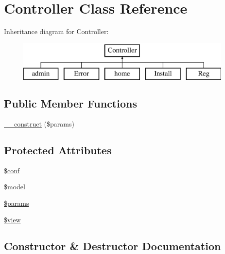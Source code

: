 \hypertarget{classController}{}\section{Controller Class Reference}
\label{classController}
Inheritance diagram for Controller\+:\begin{figure}[H]
\begin{center}
\leavevmode
\includegraphics[height=2.000000cm]{classController}
\end{center}
\end{figure}
\subsection*{Public Member Functions}
\begin{DoxyCompactItemize}
\item 
\hyperlink{classController_a3587ca21b29970ecf850db960cf5d1e2}{\+\_\+\+\_\+construct} (\$params)
\end{DoxyCompactItemize}
\subsection*{Protected Attributes}
\begin{DoxyCompactItemize}
\item 
\hyperlink{classController_a51a5fe961b85fbecd86fd82185652060}{\$conf}
\item 
\hyperlink{classController_a4078f8d070afa3d19a462422fa1a3547}{\$model}
\item 
\hyperlink{classController_a695afb7a751160a1ba0adbf5abbfe2df}{\$params}
\item 
\hyperlink{classController_aeb713d8b3c9bf61c72c4fcabd0e1e48a}{\$view}
\end{DoxyCompactItemize}


\subsection{Constructor \& Destructor Documentation}
\hypertarget{classController_a3587ca21b29970ecf850db960cf5d1e2}{}
